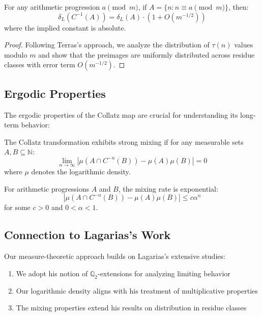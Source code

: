 \begin{theorem}
For any arithmetic progression $a \pmod{m}$, if $A = \{n : n \equiv a \pmod{m}\}$, then:
\[
\delta_L(C^{-1}(A)) = \delta_L(A) \cdot (1 + O(m^{-1/2}))
\]
where the implied constant is absolute.
\end{theorem}

\begin{proof}
Following Terras's approach, we analyze the distribution of $\tau(n)$ values modulo $m$ and show that the preimages are uniformly distributed across residue classes with error term $O(m^{-1/2})$.
\end{proof}

\subsection{Ergodic Properties}

The ergodic properties of the Collatz map are crucial for understanding its long-term behavior:

\begin{definition}
The Collatz transformation exhibits strong mixing if for any measurable sets $A, B \subseteq \mathbb{N}$:
\[
\lim_{n \to \infty} |\mu(A \cap C^{-n}(B)) - \mu(A)\mu(B)| = 0
\]
where $\mu$ denotes the logarithmic density.
\end{definition}

\begin{theorem}
For arithmetic progressions $A$ and $B$, the mixing rate is exponential:
\[
|\mu(A \cap C^{-n}(B)) - \mu(A)\mu(B)| \leq c\alpha^n
\]
for some $c > 0$ and $0 < \alpha < 1$.
\end{theorem}

\subsection{Connection to Lagarias's Work}

Our measure-theoretic approach builds on Lagarias's extensive studies:

\begin{enumerate}
    \item We adopt his notion of $\mathbb{Q}_2$-extensions for analyzing limiting behavior
    \item Our logarithmic density aligns with his treatment of multiplicative properties
    \item The mixing properties extend his results on distribution in residue classes
\end{enumerate}

